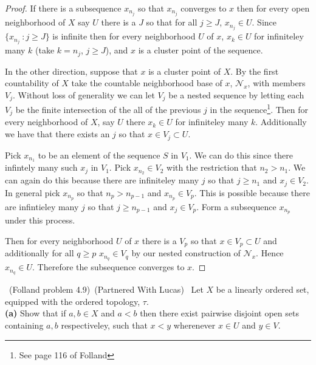 \documentclass[11pt]{amsart}
\theoremstyle{definition}
\numberwithin{theorem}{section}
\numberwithin{definition}{section}
\numberwithin{equation}{section}
\def\scriptn{{\mathcal N}}
\begin{document}
\begin{proof}
	If there is a subsequence $x_{n_j}$ so that $x_{n_j}$ converges to $x$ then for every open neighborhood of $X$ say $U$ there is a $J$ so that for all $j \geq J$, $x_{n_j} \in U.$ Since $\{x_{n_j}\ : j \geq J\}$ is infinite then for every neighborhood $U$ of $x$, $x_k \in U$ for infiniteley many $k$ (take $k = n_j$, $j \geq J$), and $x$ is a cluster point of the sequence.

	In the other direction, suppose that $x$ is a cluster point of $X$. By the first countability of $X$ take the countable neighborhood base of $x$, $\scriptn_x$, with members $V_j$.  Without loss of generality we can let $V_j$ be a nested sequence by letting each $V_j$ be the finite intersection of the all of the previous $j$ in the sequence\footnote{See page 116 of Folland}. Then for every neighborhood of $X$, say $U$ there $x_k \in U$ for infiniteley many $k$. Additionally we have that there exists an $j$ so that $x \in V_j \subset U$. 

	Pick $x_{n_1}$ to be an element of the sequence $S$ in  $V_1$. We can do this since there infintely many such $x_j$ in $V_1$. Pick $x_{n_2} \in V_2$ with the restriction that $n_2 > n_1.$ We can again do this because there are infiniteley many $j$ so that $j \geq n_1$ and $x_j \in V_2$.
	In general pick $x_{n_p}$ so that $n_p > n_{p-1}$ and $x_{n_p} \in V_p$. This is possible because there are infintieley many $j$ so that $j \geq n_{p-1}$ and $x_j \in V_p$. Form a subsequence $x_{n_p}$ under this process.

	Then for every neighborhood $U$ of $x$ there is a $V_p$ so that $x \in V_p \subset U$ and additionally for all $q \geq p $ $x_{n_q} \in V_q$ by our nested construction of $\scriptn_x$. Hence $x_{n_q} \in U$. Therefore the subsequence converges to $x$.
\end{proof} 
\medskip {}\ (Folland problem 4.9)\ 
	(Partnered With Lucas) \ Let $X$ be a linearly ordered set, equipped with the ordered topology, $\tau$. \\
\textbf{(a)} Show that if $a,b \in X$ and $a< b$ then there exist pairwise disjoint open sets containing $a,b$ respectiveley, such that $x < y$ wherenever $x \in U$ and $y \in V$.
\end{document}
